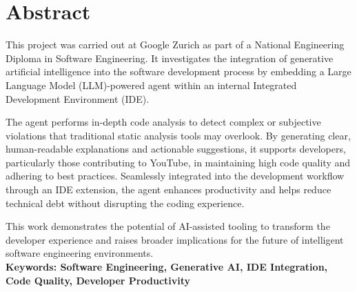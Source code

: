 \chapter*{Abstract}

This project was carried out at Google Zurich as part of a National Engineering Diploma in Software Engineering. It investigates the integration of generative artificial intelligence into the software development process by embedding a Large Language Model (LLM)-powered agent within an internal Integrated Development Environment (IDE).

The agent performs in-depth code analysis to detect complex or subjective violations that traditional static analysis tools may overlook. By generating clear, human-readable explanations and actionable suggestions, it supports developers, particularly those contributing to YouTube, in maintaining high code quality and adhering to best practices. Seamlessly integrated into the development workflow through an IDE extension, the agent enhances productivity and helps reduce technical debt without disrupting the coding experience.

This work demonstrates the potential of AI-assisted tooling to transform the developer experience and raises broader implications for the future of intelligent software engineering environments.\\

\textbf{Keywords: Software Engineering, Generative AI, IDE Integration, Code Quality, Developer Productivity}


